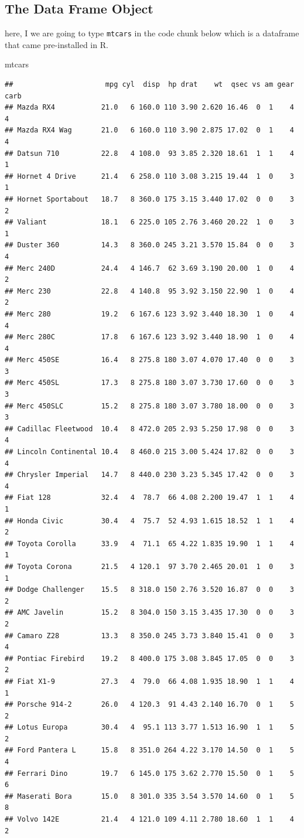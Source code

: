 \documentclass[
]{book}
\newenvironment{Shaded}{\begin{snugshade}}{\end{snugshade}}
\newcommand{\NormalTok}[1]{#1}
\begin{document}
\hypertarget{the-data-frame-object}{%
\subsection{The Data Frame Object}\label{the-data-frame-object}}

here, I we are going to type \texttt{mtcars} in the code chunk below which is a dataframe that came pre-installed in R.

\begin{Shaded}
\begin{Highlighting}[]
\NormalTok{mtcars}
\end{Highlighting}
\end{Shaded}

\begin{verbatim}
##                      mpg cyl  disp  hp drat    wt  qsec vs am gear carb
## Mazda RX4           21.0   6 160.0 110 3.90 2.620 16.46  0  1    4    4
## Mazda RX4 Wag       21.0   6 160.0 110 3.90 2.875 17.02  0  1    4    4
## Datsun 710          22.8   4 108.0  93 3.85 2.320 18.61  1  1    4    1
## Hornet 4 Drive      21.4   6 258.0 110 3.08 3.215 19.44  1  0    3    1
## Hornet Sportabout   18.7   8 360.0 175 3.15 3.440 17.02  0  0    3    2
## Valiant             18.1   6 225.0 105 2.76 3.460 20.22  1  0    3    1
## Duster 360          14.3   8 360.0 245 3.21 3.570 15.84  0  0    3    4
## Merc 240D           24.4   4 146.7  62 3.69 3.190 20.00  1  0    4    2
## Merc 230            22.8   4 140.8  95 3.92 3.150 22.90  1  0    4    2
## Merc 280            19.2   6 167.6 123 3.92 3.440 18.30  1  0    4    4
## Merc 280C           17.8   6 167.6 123 3.92 3.440 18.90  1  0    4    4
## Merc 450SE          16.4   8 275.8 180 3.07 4.070 17.40  0  0    3    3
## Merc 450SL          17.3   8 275.8 180 3.07 3.730 17.60  0  0    3    3
## Merc 450SLC         15.2   8 275.8 180 3.07 3.780 18.00  0  0    3    3
## Cadillac Fleetwood  10.4   8 472.0 205 2.93 5.250 17.98  0  0    3    4
## Lincoln Continental 10.4   8 460.0 215 3.00 5.424 17.82  0  0    3    4
## Chrysler Imperial   14.7   8 440.0 230 3.23 5.345 17.42  0  0    3    4
## Fiat 128            32.4   4  78.7  66 4.08 2.200 19.47  1  1    4    1
## Honda Civic         30.4   4  75.7  52 4.93 1.615 18.52  1  1    4    2
## Toyota Corolla      33.9   4  71.1  65 4.22 1.835 19.90  1  1    4    1
## Toyota Corona       21.5   4 120.1  97 3.70 2.465 20.01  1  0    3    1
## Dodge Challenger    15.5   8 318.0 150 2.76 3.520 16.87  0  0    3    2
## AMC Javelin         15.2   8 304.0 150 3.15 3.435 17.30  0  0    3    2
## Camaro Z28          13.3   8 350.0 245 3.73 3.840 15.41  0  0    3    4
## Pontiac Firebird    19.2   8 400.0 175 3.08 3.845 17.05  0  0    3    2
## Fiat X1-9           27.3   4  79.0  66 4.08 1.935 18.90  1  1    4    1
## Porsche 914-2       26.0   4 120.3  91 4.43 2.140 16.70  0  1    5    2
## Lotus Europa        30.4   4  95.1 113 3.77 1.513 16.90  1  1    5    2
## Ford Pantera L      15.8   8 351.0 264 4.22 3.170 14.50  0  1    5    4
## Ferrari Dino        19.7   6 145.0 175 3.62 2.770 15.50  0  1    5    6
## Maserati Bora       15.0   8 301.0 335 3.54 3.570 14.60  0  1    5    8
## Volvo 142E          21.4   4 121.0 109 4.11 2.780 18.60  1  1    4    2
\end{verbatim}
\end{document}
